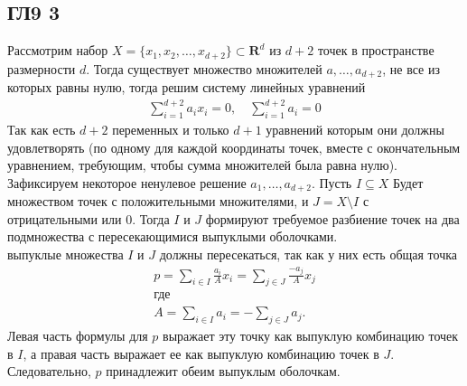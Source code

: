 \subsection*{ГЛ9 3}
Рассмотрим набор $X=\{x_1,x_2,\dots,x_{d+2}\}\subset \mathbf{R}^d$ из $d+2$ точек в пространстве размерности $d$. Тогда существует множество множителей $a,\ldots,a_{d+2}$, не все из которых равны нулю, тогда решим систему линейных уравнений
\begin{gather*}
	\sum\limits_{i=1}^{d+2} a_i x_i=0,\quad \sum\limits_{i=1}^{d+2} a_i=0
\end{gather*}
Так как есть $d+2$ переменных и только $d+1$ уравнений которым они должны удовлетворять (по одному для каждой координаты точек, вместе с окончательным уравнением, требующим, чтобы сумма множителей была равна нулю). Зафиксируем некоторое ненулевое решение  $a_{1},\ldots,a_{d+2}$. Пусть $I\subseteq X$ Будет множеством точек с положительными множителями, и $J=X\setminus I$ с отрицательными или 0. Тогда $I$ и $J$ формируют требуемое разбиение точек на два подмножества с пересекающимися выпуклыми оболочками.\\		
выпуклые множества $I$ и $J$ должны пересекаться, так как у них есть общая точка
\begin{gather*}
	p= \sum\limits_{i\in I}\frac{a_i}{A} x_i=\sum\limits_{j\in J}\frac{-a_j}{A}x_j\\
	\text{где}\\
	A=\sum\limits_{i\in I} a_i=-\sum\limits_{j\in J} a_j.
\end{gather*}
Левая часть формулы для $p$ выражает эту точку как выпуклую комбинацию точек в $I$, а правая часть выражает ее как выпуклую комбинацию точек в $J$. Следовательно, $p$ принадлежит обеим выпуклым оболочкам.\\
		